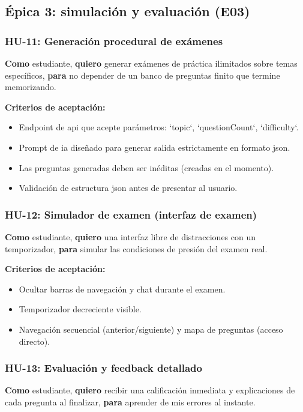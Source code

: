 \subsection{Épica 3: simulación y evaluación (E03)}

\subsubsection{HU-11: Generación procedural de exámenes}
\textbf{Como} estudiante,
\textbf{quiero} generar exámenes de práctica ilimitados sobre temas específicos,
\textbf{para} no depender de un banco de preguntas finito que termine memorizando.

\textbf{Criterios de aceptación:}
\begin{itemize}
\item Endpoint de \gls{api} que acepte parámetros: `topic`, `questionCount`, `difficulty`.
\item Prompt de \gls{ia} diseñado para generar salida estrictamente en formato \gls{json}.
\item Las preguntas generadas deben ser inéditas (creadas en el momento).
\item Validación de estructura \gls{json} antes de presentar al usuario.
\end{itemize}

\subsubsection{HU-12: Simulador de examen (interfaz de examen)}
\textbf{Como} estudiante,
\textbf{quiero} una interfaz libre de distracciones con un temporizador,
\textbf{para} simular las condiciones de presión del examen real.

\textbf{Criterios de aceptación:}
\begin{itemize}
\item Ocultar barras de navegación y chat durante el examen.
\item Temporizador decreciente visible.
\item Navegación secuencial (anterior/siguiente) y mapa de preguntas (acceso directo).
\end{itemize}

\subsubsection{HU-13: Evaluación y feedback detallado}
\textbf{Como} estudiante,
\textbf{quiero} recibir una calificación inmediata y explicaciones de cada pregunta al finalizar,
\textbf{para} aprender de mis errores al instante.

